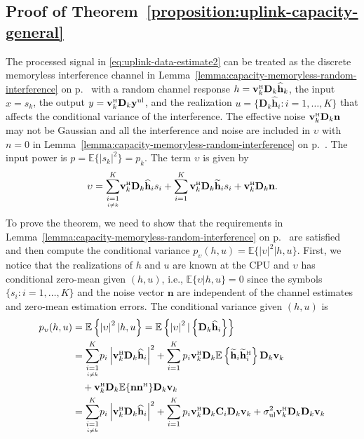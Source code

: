 \documentclass[SIG,biber]{nowfnt}
\newcommand{\vect}[1]{\mathbf{#1}}
\newcommand{\condSum}[3]{\overset{#3}{\underset{\underset{#2}{#1}}{\sum}}}
\def\Htran{\mbox{\tiny $\mathrm{H}$}}
\def\sigmaUL{\sigma^2_{\mathrm{ul}}}
\begin{document}
\subsection{Proof of Theorem~\ref{proposition:uplink-capacity-general}}\label{proof-of-proposition:uplink-capacity-general}
	
	The processed signal in \eqref{eq:uplink-data-estimate2} can be treated as the discrete memoryless interference channel in Lemma~\ref{lemma:capacity-memoryless-random-interference} on p.~\pageref{lemma:capacity-memoryless-random-interference} with a random channel response $h=\vect{v}_k^{\Htran}\vect{D}_k\widehat{\vect{h}}_k $, the input $x=s_k$, the output $y=\vect{v}_k^{\Htran}\vect{D}_k\vect{y}^{\rm{ul}}$, and the realization  $u=\{\vect{D}_k\widehat{\vect{h}}_i:i=1,\ldots,K\}$ that affects the conditional variance of the interference. The effective noise $\vect{v}_k^{\Htran}\vect{D}_k\vect{n}$ may not be Gaussian and all the interference and noise are included in $\upsilon$ with $n=0$ in Lemma~\ref{lemma:capacity-memoryless-random-interference} on p.~\pageref{lemma:capacity-memoryless-random-interference}. The input power is $p=\mathbb{E}\{\left|s_k\right|^2\}=p_k$. The term $\upsilon$ is given by
	\begin{align}
		\upsilon=\condSum{i=1}{i \neq k}{K}\vect{v}_k^{\Htran}\vect{D}_k\widehat{\vect{h}}_i s_i+\sum_{i=1}^K\vect{v}_k^{\Htran}\vect{D}_k\widetilde{\vect{h}}_i s_i+\vect{v}_k^{\Htran}\vect{D}_k\vect{n}.
		\end{align}
	To prove the theorem, we need to show that the requirements in Lemma~\ref{lemma:capacity-memoryless-random-interference} on p.~\pageref{lemma:capacity-memoryless-random-interference} are satisfied and then compute the conditional variance $p_{\upsilon}(h,u)=\mathbb{E}\{\left|\upsilon\right|^2|h,u\}$. First, we notice that the realizations of $h$ and $u$ are known at the CPU and $\upsilon$ has conditional zero-mean given $(h,u)$, i.e., $\mathbb{E}\{\upsilon|h,u\}=0$ since the  symbols $\{s_i:i=1,\ldots,K\}$ and the noise vector $\vect{n}$ are independent of the channel estimates and zero-mean estimation errors. The conditional variance given $(h,u)$ is
	\begingroup
	\allowdisplaybreaks
	\begin{align}
	p_{\upsilon}(h,u)&=\mathbb{E}\left\{\left|\upsilon\right|^2|h,u\right\}=\mathbb{E}\left\{\left|\upsilon\right|^2|\left\{\vect{D}_k\widehat{\vect{h}}_i\right\}\right\}\nonumber\\
	&=\condSum{i=1}{i \neq k}{K}p_i\left|\vect{v}_k^{\Htran}\vect{D}_k\widehat{\vect{h}}_i\right|^2+\sum_{i=1}^Kp_i\vect{v}_k^{\Htran}\vect{D}_k\mathbb{E}\left\{\widetilde{\vect{h}}_i\widetilde{\vect{h}}_i^{\Htran}\right\}\vect{D}_k\vect{v}_k\nonumber\\&\quad+\vect{v}_k^{\Htran}\vect{D}_k\mathbb{E}\{\vect{n}\vect{n}^{\Htran}\}\vect{D}_k\vect{v}_k
	 \nonumber \\
	 &=\condSum{i=1}{i \neq k}{K} p_i\left|\vect{v}_k^{\Htran}\vect{D}_k\widehat{\vect{h}}_i\right|^2+\sum_{i=1}^Kp_i\vect{v}_k^{\Htran}\vect{D}_k\vect{C}_i\vect{D}_k\vect{v}_k+\sigmaUL\vect{v}_k^{\Htran}\vect{D}_k\vect{D}_k\vect{v}_k
		\end{align}
\end{document}
